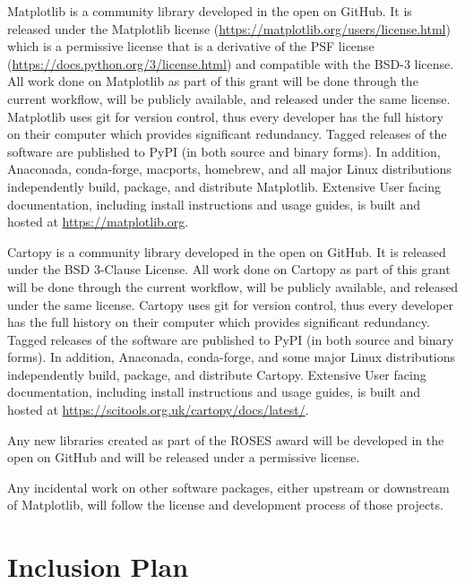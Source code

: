 \documentclass[12pt]{article}
\numberwithin{page}{section}
\begin{document}
Matplotlib is a community library developed in the open on GitHub.
It is released under the Matplotlib license
(\url{https://matplotlib.org/users/license.html}) which is a permissive
license that is a derivative of the PSF license
(\url{https://docs.python.org/3/license.html}) and compatible with the
BSD-3 license.  All work done on Matplotlib as part of this grant will
be done through the current workflow, will be publicly available, and
released under the same license.  Matplotlib uses git for version
control, thus every developer has the full history on their computer
which provides significant redundancy.  Tagged releases of the
software are published to PyPI (in both source and binary forms).  In
addition, Anaconada, conda-forge, macports, homebrew, and all major Linux
distributions independently build, package, and distribute Matplotlib.
Extensive User facing documentation, including install instructions
and usage guides, is built and hosted at \url{https://matplotlib.org}.

Cartopy is a community library developed in the open on GitHub.  It is released
under the BSD 3-Clause License.  All work done on Cartopy as part of this grant
will be done through the current workflow, will be publicly available, and
released under the same license.  Cartopy uses git for version control, thus
every developer has the full history on their computer which provides
significant redundancy.  Tagged releases of the software are published to PyPI
(in both source and binary forms).
In addition, Anaconada, conda-forge, and some major Linux
distributions independently build, package, and distribute Cartopy.
Extensive User facing documentation, including install instructions and usage
guides, is built and hosted at
\url{https://scitools.org.uk/cartopy/docs/latest/}.

Any new libraries created as part of the ROSES award will be developed
in the open on GitHub and will be released under a permissive license.

Any incidental work on other software packages, either upstream or
downstream of Matplotlib, will follow the license and development
process of those projects.

\newpage

\section{Inclusion Plan}
\setcounter{page}{1}
\end{document}
